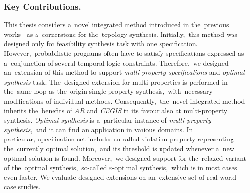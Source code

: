 \subsubsection*{Key Contributions.}
This thesis considers a~novel integrated method introduced in the~previous works~\cite{roman-DP,tacas21} as a~cornerstone for the~topology synthesis.
Initially,~this method was designed only for feasibility synthesis task with one specification.
However,~probabilistic programs often have to satisfy specifications expressed as a~conjunction of several temporal logic constraints.
Therefore,~we designed an~extension of this method to support \textit{multi-property specifications} and \textit{optimal synthesis} task.
The~designed extension for multi-properties is performed in the~same loop as the~origin single-property synthesis,~with~necessary modifications of individual methods.
Consequently,~the~novel integrated method inherits the~benefits of \textit{AR} and \textit{CEGIS} in its favour also at multi-property synthesis.
\textit{Optimal synthesis} is a~particular instance of \textit{multi-property synthesis},~and it can find an application in various domains.
In particular,~specification set includes so-called violation property representing the~currently optimal solution,~and its threshold is updated whenever a~new optimal solution is found.
Moreover,~we designed support for the~relaxed variant of the~optimal synthesis,~so-called $\varepsilon$-optimal synthesis,~which is in most cases even faster.
We evaluate designed extensions on an~extensive set of real-world case studies. 


